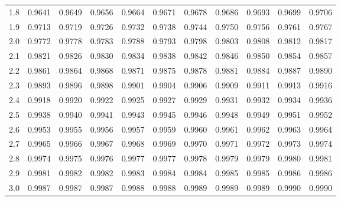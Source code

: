 \begin{figure}[!h]
\begin{center}
\begin{tabular}{|r|rrrrrrrrrr|}
1.8&0.9641&0.9649&0.9656&0.9664&0.9671&0.9678&0.9686&0.9693&0.9699&0.9706\\
1.9&0.9713&0.9719&0.9726&0.9732&0.9738&0.9744&0.9750&0.9756&0.9761&0.9767\\
2.0&0.9772&0.9778&0.9783&0.9788&0.9793&0.9798&0.9803&0.9808&0.9812&0.9817\\
2.1&0.9821&0.9826&0.9830&0.9834&0.9838&0.9842&0.9846&0.9850&0.9854&0.9857\\
2.2&0.9861&0.9864&0.9868&0.9871&0.9875&0.9878&0.9881&0.9884&0.9887&0.9890\\
2.3&0.9893&0.9896&0.9898&0.9901&0.9904&0.9906&0.9909&0.9911&0.9913&0.9916\\
2.4&0.9918&0.9920&0.9922&0.9925&0.9927&0.9929&0.9931&0.9932&0.9934&0.9936\\
2.5&0.9938&0.9940&0.9941&0.9943&0.9945&0.9946&0.9948&0.9949&0.9951&0.9952\\
2.6&0.9953&0.9955&0.9956&0.9957&0.9959&0.9960&0.9961&0.9962&0.9963&0.9964\\
2.7&0.9965&0.9966&0.9967&0.9968&0.9969&0.9970&0.9971&0.9972&0.9973&0.9974\\
2.8&0.9974&0.9975&0.9976&0.9977&0.9977&0.9978&0.9979&0.9979&0.9980&0.9981\\
2.9&0.9981&0.9982&0.9982&0.9983&0.9984&0.9984&0.9985&0.9985&0.9986&0.9986\\
3.0&0.9987&0.9987&0.9987&0.9988&0.9988&0.9989&0.9989&0.9989&0.9990&0.9990\\
\hline
\end{tabular}
\end{center}
\end{figure}

\pagebreak
